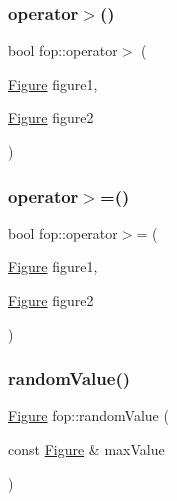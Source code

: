 \subsubsection{\texorpdfstring{operator$>$()}{operator>()}}
{\footnotesize\ttfamily bool fop\+::operator$>$ (\begin{DoxyParamCaption}\item[{\mbox{\hyperlink{classfop_1_1_figure}{Figure}}}]{figure1,  }\item[{\mbox{\hyperlink{classfop_1_1_figure}{Figure}}}]{figure2 }\end{DoxyParamCaption})}

\mbox{\label{namespacefop_a8989439cb0227ca3d76c92a3f515366d}} 
\subsubsection{\texorpdfstring{operator$>$=()}{operator>=()}}
{\footnotesize\ttfamily bool fop\+::operator$>$= (\begin{DoxyParamCaption}\item[{\mbox{\hyperlink{classfop_1_1_figure}{Figure}}}]{figure1,  }\item[{\mbox{\hyperlink{classfop_1_1_figure}{Figure}}}]{figure2 }\end{DoxyParamCaption})}

\mbox{\label{namespacefop_af4426fe719704633a3129439207583ce}} 
\subsubsection{\texorpdfstring{random\+Value()}{randomValue()}}
{\footnotesize\ttfamily \mbox{\hyperlink{classfop_1_1_figure}{Figure}} fop\+::random\+Value (\begin{DoxyParamCaption}\item[{const \mbox{\hyperlink{classfop_1_1_figure}{Figure}} \&}]{max\+Value }\end{DoxyParamCaption})}

\mbox{\label{namespacefop_a28077bc23913a5e5f1522e7fbb13bcfe}} 
